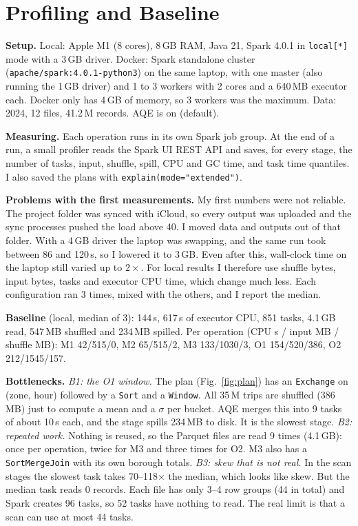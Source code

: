 \documentclass[sigconf]{acmart}
\begin{document}
\section{Profiling and Baseline}

\textbf{Setup.} Local: Apple M1 (8 cores), 8\,GB RAM, Java 21, Spark 4.0.1 in
\texttt{local[*]} mode with a 3\,GB driver. Docker: Spark standalone cluster
(\texttt{apache/spark:4.0.1-python3}) on the same laptop, with one master
(also running the 1\,GB driver) and 1 to 3 workers with 2 cores and a 640\,MB
executor each. Docker only has 4\,GB of memory, so 3 workers was the maximum.
Data: 2024, 12 files, 41.2\,M records. AQE is on (default).

\textbf{Measuring.} Each operation runs in its own Spark job group. At the end
of a run, a small profiler reads the Spark UI REST API and saves, for every
stage, the number of tasks, input, shuffle, spill, CPU and GC time, and task
time quantiles. I also saved the plans with \texttt{explain(mode="extended")}.

\textbf{Problems with the first measurements.} My first numbers were not
reliable. The project folder was synced with iCloud, so every output was
uploaded and the sync processes pushed the load above 40. I moved data and
outputs out of that folder. With a 4\,GB driver the laptop was swapping, and
the same run took between 86 and 120\,s, so I lowered it to 3\,GB. Even after
this, wall-clock time on the laptop still varied up to $2\times$. For local
results I therefore use shuffle bytes, input bytes, tasks and executor CPU
time, which change much less. Each configuration ran 3 times, mixed with the
others, and I report the median.

\textbf{Baseline} (local, median of 3): 144\,s, 617\,s of executor CPU, 851
tasks, 4.1\,GB read, 547\,MB shuffled and 234\,MB spilled. Per operation
(CPU s / input MB / shuffle MB): M1 42/515/0, M2 65/515/2, M3 133/1030/3,
O1 154/520/386, O2 212/1545/157.

\textbf{Bottlenecks.}
\emph{B1: the O1 window.} The plan (Fig.~\ref{fig:plan}) has an
\texttt{Exchange} on (zone, hour) followed by a \texttt{Sort} and a
\texttt{Window}. All 35\,M trips are shuffled (386\,MB) just to compute a mean
and a $\sigma$ per bucket. AQE merges this into 9 tasks of about 10\,s each,
and the stage spills 234\,MB to disk. It is the slowest stage.
\emph{B2: repeated work.} Nothing is reused, so the Parquet files are read 9
times (4.1\,GB): once per operation, twice for M3 and three times for O2. M3
also has a \texttt{SortMergeJoin} with its own borough totals.
\emph{B3: skew that is not real.} In the scan stages the slowest task takes
70--118$\times$ the median, which looks like skew. But the median task reads 0
records. Each file has only 3--4 row groups (44 in total) and Spark creates 96
tasks, so 52 tasks have nothing to read. The real limit is that a scan can use
at most 44 tasks.
\end{document}

